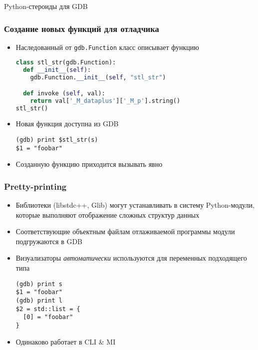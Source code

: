 \documentclass[onlymath]{beamer}
\newcommand\code\texttt
\begin{document}
\begin{subsection}{Python-стероиды для GDB}
\begin{frame}[fragile]
  \frametitle{Создание новых функций для отладчика}
  \begin{itemize}
  \item Наследованный от \code{gdb.Function} класс описывает функцию
\begin{lstlisting}[language=Python]
class stl_str(gdb.Function):
  def __init__(self):
    gdb.Function.__init__(self, "stl_str")

  def invoke (self, val):
    return val['_M_dataplus']['_M_p'].string()
stl_str()
\end{lstlisting}
  \item Новая функция доступна из GDB
\begin{lstlisting}[language=gdb,frameround=tttt]
(gdb) print $stl_str(s)
$1 = "foobar"
\end{lstlisting}
  \item Созданную функцию приходится вызывать явно
  \end{itemize}
\end{frame}  

\begin{frame}[fragile]
  \frametitle{Pretty-printing}
  \begin{itemize}
  \item Библиотеки (libstdc++, Glib) могут устанавливать в систему
    Python-модули, которые выполняют отображение сложных структур
    данных
  \item Соответствующие объектным файлам отлаживаемой программы модули
    подгружаются в GDB
  \item Визуализаторы \emph{автоматически} используются для переменных
    подходящего типа
\begin{lstlisting}[language=gdb,frameround=tttt]
(gdb) print s
$1 = "foobar"
(gdb) print l
$2 = std::list = {
  [0] = "foobar"
}
\end{lstlisting}
  \item Одинаково работает в CLI \& MI
  \end{itemize}
\end{frame}
\end{subsection}
\end{document}
